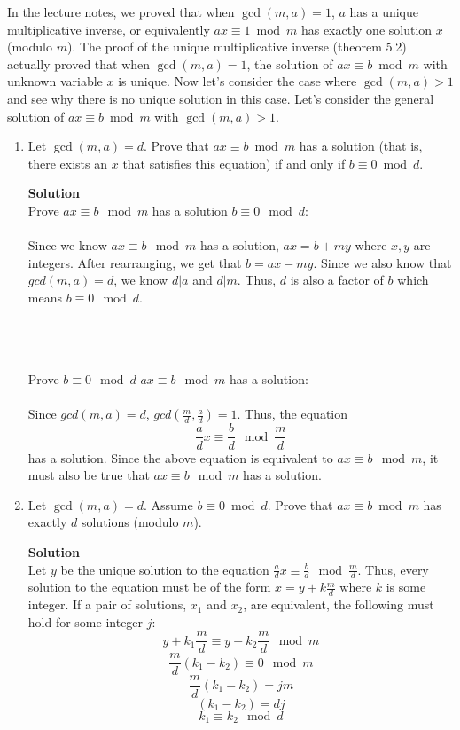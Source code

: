 \documentclass[11pt]{article}
\newenvironment{Parts}{\begin{enumerate}[label=(\alph*)]}{\end{enumerate}}
\newcommand*{\Part}{\item}
\newenvironment{Answer}{\vspace{10pt}\begin{mdframed}\textbf{Solution}\\}{\end{mdframed}\vfill\pagebreak[3]}
\newenvironment{Answer}{\vspace{10pt}}{\vfill\pagebreak[3]}
\begin{document}
In the lecture notes, we proved that when $\gcd(m, a) = 1$, $a$ has a unique multiplicative inverse, or equivalently $ax \equiv 1\bmod m$ has exactly one solution $x$ (modulo $m$). The proof of the unique multiplicative inverse (theorem 5.2) actually proved that when $\gcd(m, a) = 1$, the solution of $ax \equiv b\bmod m$ with unknown variable $x$ is unique. Now let's consider the case where $\gcd(m, a)>1$ and see why there is no unique solution in this case. Let's consider the general solution of $ax \equiv b\bmod m$ with $\gcd(m, a)>1$.
\begin{Parts}
		
	\Part Let $\gcd(m, a) = d$. Prove that $ax \equiv b\bmod m$ has a solution (that is, there exists an $x$ that satisfies this equation) if and only if $b\equiv0\bmod d$.
	\begin{Answer}
	    Prove $ax \equiv b \mod m$ has a solution \implies $b \equiv 0 \mod d$:
	    \\
		\\
		Since we know $ax \equiv b \mod m$ has a solution, $ax=b+my$ where $x,y$ are integers. After rearranging, we get that $b=ax-my$. Since we also know that $gcd(m,a)=d$, we know $d|a$ and $d|m$. Thus, $d$ is also a factor of $b$ which means $b \equiv 0 \mod d$.
		
		\\
		\\
		\\
		
		Prove $b \equiv 0 \mod d$ \implies $ax \equiv b \mod m$ has a solution:
	    \\
		\\
		Since $gcd(m,a)=d$, $gcd(\frac{m}{d}, \frac{a}{d})=1$. Thus, the equation $$\frac{a}{d}x \equiv \frac{b}{d} \mod \frac{m}{d}$$ has a solution. Since the above equation is equivalent to $ax \equiv b \mod m$, it must also be true that $ax \equiv b \mod m$ has a solution. 
		
	\end{Answer}
	\Part Let $\gcd(m, a) = d$. Assume $b \equiv 0\bmod d$. Prove that $ax \equiv b\bmod m$ has exactly $d$ solutions (modulo $m$).
	\begin{Answer}
	    Let $y$ be the unique solution to the equation $\frac{a}{d}x \equiv \frac{b}{d} \mod \frac{m}{d}$. Thus, every solution to the equation must be of the form $x=y+k \frac{m}{d}$ where $k$ is some integer. If a pair of solutions, $x_1$ and $x_2$, are equivalent, the following must hold for some integer $j$:
	    $$y+k_1 \frac{m}{d} \equiv y+k_2 \frac{m}{d} \mod m$$
	    $$\frac{m}{d}(k_1-k_2)\equiv 0 \mod m$$
	    $$\frac{m}{d}(k_1-k_2)=jm$$
	    $$(k_1-k_2)=dj$$
	    $$k_1 \equiv k_2 \mod d$$
	    

\end{Answer}
\end{Parts}
\end{document}
